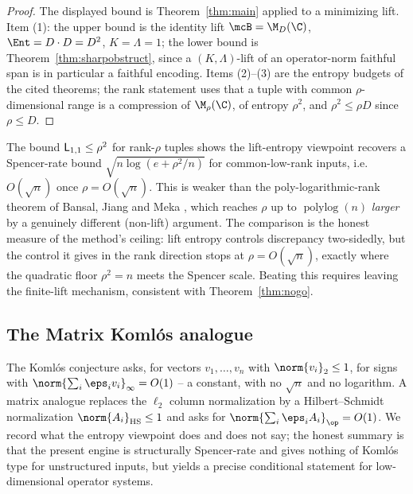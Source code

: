 \begin{proof}
The displayed bound is Theorem~\ref{thm:main} applied to a minimizing lift. Item
(1): the upper bound is the identity lift $\mcB=\M_D(\C)$, $\Ent=D\cdot D=D^2$,
$K=\Lambda=1$; the lower bound is Theorem~\ref{thm:sharpobstruct}, since a
$(K,\Lambda)$-lift of an operator-norm faithful span is in particular a faithful
encoding. Items (2)--(3) are the entropy budgets of the cited theorems; the
rank statement uses that a tuple with common $\rho$-dimensional range is a
compression of $\M_\rho(\C)$, of entropy $\rho^2$, and $\rho^2\le\rho D$ since
$\rho\le D$.
\end{proof}

\begin{remark}\label{rem:rank}
The bound $\mathsf L_{1,1}\le\rho^2$ for rank-$\rho$ tuples shows the lift-entropy
viewpoint recovers a Spencer-rate bound $\sqrt{n\log(e+\rho^2/n)}$ for
common-low-rank inputs, i.e. $O(\sqrt n)$ once $\rho=O(\sqrt n)$. This is weaker
than the poly-logarithmic-rank theorem of Bansal, Jiang and Meka \cite{BJM}, which
reaches $\rho$ up to $\operatorname{polylog}(n)$ \emph{larger} by a genuinely
different (non-lift) argument. The comparison is the honest measure of the
method's ceiling: lift entropy controls discrepancy two-sidedly, but the control
it gives in the rank direction stops at $\rho=O(\sqrt n)$, exactly where the
quadratic floor $\rho^2=n$ meets the Spencer scale. Beating this requires leaving
the finite-lift mechanism, consistent with Theorem~\ref{thm:nogo}.
\end{remark}

\subsection{The Matrix Koml\'os analogue}
\label{subsec:komlos}

The Koml\'os conjecture asks, for vectors $v_1,\ldots,v_n$ with
$\norm{v_i}_2\le1$, for signs with $\norm{\sum_i\eps_iv_i}_\infty=O(1)$ -- a
constant, with no $\sqrt n$ and no logarithm. A matrix analogue replaces the
$\ell_2$ column normalization by a Hilbert--Schmidt normalization
$\norm{A_i}_{\HS}\le1$ and asks for $\norm{\sum_i\eps_iA_i}_{\op}=O(1)$. We record
what the entropy viewpoint does and does not say; the honest summary is that the
present engine is structurally Spencer-rate and gives nothing of Koml\'os type for
unstructured inputs, but yields a precise conditional statement for
low-dimensional operator systems.

